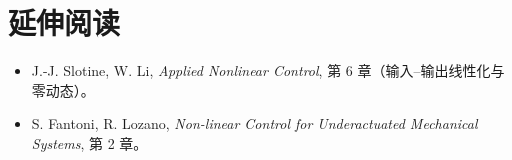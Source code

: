 \section*{延伸阅读}
\begin{itemize}[leftmargin=2em,itemsep=2pt]
  \item J.-J. Slotine, W. Li, \emph{Applied Nonlinear Control}, 第 6 章（输入–输出线性化与零动态）。
  \item S. Fantoni, R. Lozano, \emph{Non-linear Control for Underactuated Mechanical Systems}, 第 2 章。
\end{itemize}
